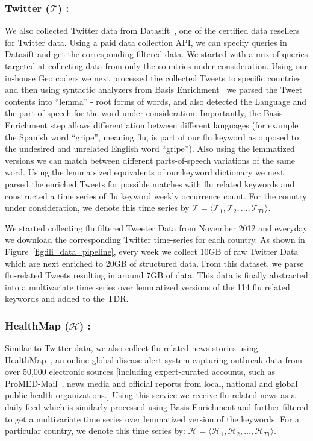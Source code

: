 \subsubsection{Twitter ($\mathcal{T}$) :} 
We also collected Twitter data from Datasift~\cite{Twitter:2013},
one of the certified data resellers for
Twitter data. Using a paid data collection API, we can specify queries in
Datasift and get the corresponding filtered data.  We started with a mix of
queries targeted at collecting data from only the countries under
consideration. Using our in-house Geo coders we next processed the collected
Tweets to specific countries and then using syntactic analyzers from Basis
Enrichment~\cite{Basis:2013} we parsed the Tweet contents into ``lemma'' - root
forms of words, and also detected the Language and the part of speech for the
word under consideration.  Importantly, the Basis Enrichment step allows
differentiation between different languages (for example the Spanish word
``gripe'', meaning flu, is part of our flu keyword as opposed to the undesired
and unrelated English word ``gripe''). Also using the lemmatized versions we
can match between different parts-of-speech variations of the same word. Using
the lemma sized equivalents of our keyword dictionary we next parsed the
enriched Tweets for possible matches with flu related keywords and constructed
a time series of flu keyword weekly occurrence count. For the country under
consideration, we denote this time series by 
$\mathcal{T} = \langle \mathcal{T}_1, \mathcal{T}_2, \dots, \mathcal{T}_{T1} \rangle$.

We started collecting flu filtered Tweeter Data from November 2012 and everyday
we download the corresponding Twitter time-series for each country. As shown in
Figure~\ref{fig:ili_data_pipeline}, every week we collect 10GB of raw Twitter
Data which are next enriched to 20GB of structured data. From this dataset, we
parse flu-related Tweets resulting in around 7GB of data. This data is finally
abstracted into a multivariate time series over lemmatized versions of the 114
flu related keywords and added to the TDR. 

\subsubsection{HealthMap ($\mathcal{H}$) :} 
Similar to Twitter data, we also collect flu-related
news stories using HealthMap~\cite{HM:2013}, an online global disease alert
system capturing outbreak data from over 50,000 electronic sources [including
  expert-curated accounts, such as ProMED-Mail~\cite{chase1996promed}, news media
and official reports from local, national and global public health
organizations.] Using this service we receive flu-related news as a daily feed
which is similarly processed using Basis Enrichment and further filtered to get
a multivariate time series over  lemmatized version of the keywords. For a
particular country, we denote this time series by: 
$\mathcal{H} = \langle \mathcal{H}_1, \mathcal{H}_2, \dots, \mathcal{H}_{T1} \rangle$.

